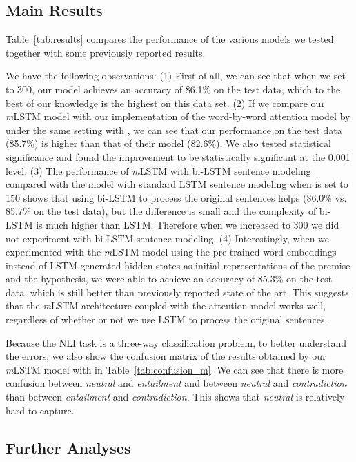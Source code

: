 \documentclass[11pt,letterpaper]{article}
\begin{document}
\subsection{Main Results}

Table~\ref{tab:results} compares the performance of the various models we tested together with some previously reported results.


We have the following observations:
(1) First of all, we can see that when we set  to 300, our model achieves an accuracy of 86.1\% on the test data, which to the best of our knowledge is the highest on this data set.
(2) If we compare our \emph{m}LSTM model with our implementation of the word-by-word attention model by  under the same setting with , we can see that our performance on the test data (85.7\%) is higher than that of their model (82.6\%).
We also tested statistical significance and found the improvement to be statistically significant at the 0.001 level.
(3) The performance of \emph{m}LSTM with bi-LSTM sentence modeling compared with the model with standard LSTM sentence modeling when  is set to 150 shows that using bi-LSTM to process the original sentences helps (86.0\% vs. 85.7\% on the test data), but the difference is small and the complexity of bi-LSTM is much higher than LSTM.
Therefore when we increased  to 300 we did not experiment with bi-LSTM sentence modeling.
(4) Interestingly, when we experimented with the \emph{m}LSTM model using the pre-trained word embeddings instead of LSTM-generated hidden states as initial representations of the premise and the hypothesis, we were able to achieve an accuracy of 85.3\% on the test data, which is still better than previously reported state of the art.
This suggests that the \emph{m}LSTM architecture coupled with the attention model works well, regardless of whether or not we use LSTM to process the original sentences.

Because the NLI task is a three-way classification problem, to better understand the errors, we also show the confusion matrix of the results obtained by our \emph{m}LSTM model with  in Table~\ref{tab:confusion_m}.
We can see that there is more confusion between \emph{neutral} and \emph{entailment} and between \emph{neutral} and \emph{contradiction} than between \emph{entailment} and \emph{contradiction}.
This shows that \emph{neutral} is relatively hard to capture.






\subsection{Further Analyses}
\end{document}
